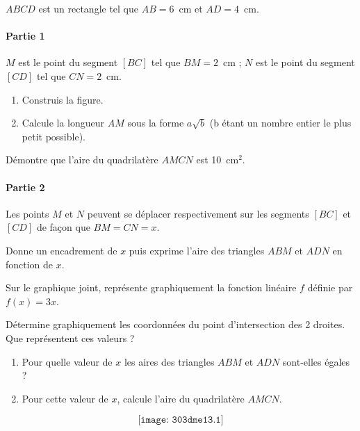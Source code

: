 $ABCD$ est un rectangle tel que $AB=6$~cm et $AD=4$~cm.
\paragraph{Partie 1} $M$ est le point du segment $[BC]$ tel que
$BM=2$~cm ; $N$ est le point du segment $[CD]$ tel que $CN=2$~cm.
\begin{myenumerate}
\item
\begin{enumerate}
\item Construis la figure.
\item Calcule la longueur $AM$ sous la forme $a\sqrt b$ (b étant un
nombre entier le plus petit possible).
\end{enumerate}
\item Démontre que l'aire du quadrilatère $AMCN$ est 10~cm$^2$.
\end{myenumerate}
\paragraph{Partie 2} Les points $M$ et $N$ peuvent se déplacer
respectivement sur les segments $[BC]$ et $[CD]$ de façon que
$BM=CN=x$.
\begin{myenumerate}
\item Donne un encadrement de $x$ puis exprime l'aire des triangles
$ABM$ et $ADN$ en fonction de $x$.
\item Sur le graphique joint, représente graphiquement la fonction
linéaire $f$ définie par $f(x)=3x$.
\item Détermine graphiquement les coordonnées du point d'intersection
des 2 droites. Que représentent ces valeurs ?
\item
\begin{enumerate}
\item Pour quelle valeur de $x$ les aires des triangles $ABM$ et $ADN$
sont-elles égales ?
\item Pour cette valeur de $x$, calcule l'aire du quadrilatère $AMCN$.
\end{enumerate}
\end{myenumerate}
\[\texttt{[image: 303dme13.1]}\]
